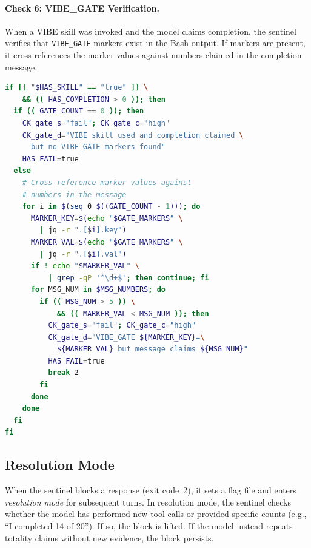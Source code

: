 \paragraph{Check 6: VIBE\_GATE Verification.}
When a VIBE skill was invoked and the model claims completion, the sentinel
verifies that \texttt{VIBE\_GATE} markers exist in the Bash output. If markers
are present, it cross-references the marker values against numbers claimed in
the completion message.

\begin{lstlisting}[language=bash,caption={Check 6: VIBE\_GATE marker verification.}]
if [[ "$HAS_SKILL" == "true" ]] \
    && (( HAS_COMPLETION > 0 )); then
  if (( GATE_COUNT == 0 )); then
    CK_gate_s="fail"; CK_gate_c="high"
    CK_gate_d="VIBE skill used and completion claimed \
      but no VIBE_GATE markers found"
    HAS_FAIL=true
  else
    # Cross-reference marker values against
    # numbers in the message
    for i in $(seq 0 $((GATE_COUNT - 1))); do
      MARKER_KEY=$(echo "$GATE_MARKERS" \
        | jq -r ".[$i].key")
      MARKER_VAL=$(echo "$GATE_MARKERS" \
        | jq -r ".[$i].val")
      if ! echo "$MARKER_VAL" \
          | grep -qP '^\d+$'; then continue; fi
      for MSG_NUM in $MSG_NUMBERS; do
        if (( MSG_NUM > 5 )) \
            && (( MARKER_VAL < MSG_NUM )); then
          CK_gate_s="fail"; CK_gate_c="high"
          CK_gate_d="VIBE_GATE ${MARKER_KEY}=\
            ${MARKER_VAL} but message claims ${MSG_NUM}"
          HAS_FAIL=true
          break 2
        fi
      done
    done
  fi
fi
\end{lstlisting}

\subsection{Resolution Mode}

When the sentinel blocks a response (exit code~2), it sets a flag file and
enters \emph{resolution mode} for subsequent turns. In resolution mode, the
sentinel checks whether the model has performed new tool calls or provided
specific counts (e.g., ``I completed 14 of 20''). If so, the block is lifted.
If the model instead repeats totality claims without new evidence, the block
persists.


